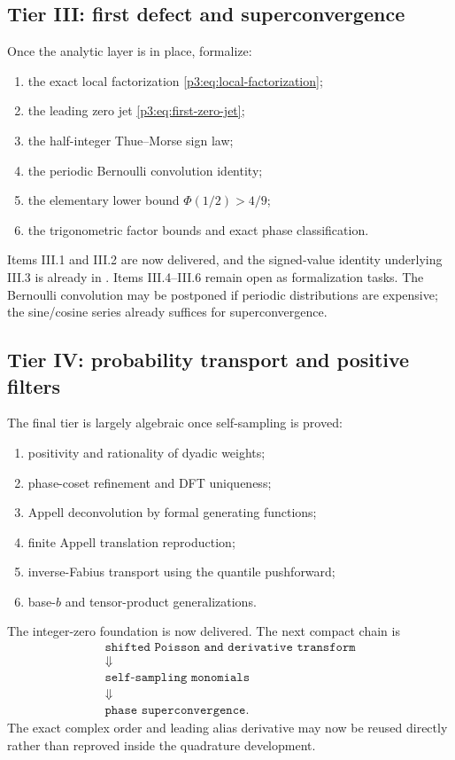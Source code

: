 \documentclass[11pt,oneside]{article}
\numberwithin{equation}{section}
\theoremstyle{definition}
\theoremstyle{remark}
\begin{document}
\subsection{Tier III: first defect and superconvergence}

Once the analytic layer is in place, formalize:
\begin{enumerate}[label=\textbf{III.\arabic*}]
\item the exact local factorization \eqref{p3:eq:local-factorization};
\item the leading zero jet \eqref{p3:eq:first-zero-jet};
\item the half-integer Thue--Morse sign law;
\item the periodic Bernoulli convolution identity;
\item the elementary lower bound $\Phi(1/2)>4/9$;
\item the trigonometric factor bounds and exact phase classification.
\end{enumerate}
Items III.1 and III.2 are now delivered, and the signed-value identity
underlying III.3 is already in .  Items
III.4--III.6 remain open as formalization tasks.
The Bernoulli convolution may be postponed if periodic distributions are expensive; the sine/cosine series already suffices for superconvergence.

\subsection{Tier IV: probability transport and positive filters}

The final tier is largely algebraic once self-sampling is proved:
\begin{enumerate}[label=\textbf{IV.\arabic*}]
\item positivity and rationality of dyadic weights;
\item phase-coset refinement and DFT uniqueness;
\item Appell deconvolution by formal generating functions;
\item finite Appell translation reproduction;
\item inverse-Fabius transport using the quantile pushforward;
\item base-$b$ and tensor-product generalizations.
\end{enumerate}

\begin{statusbox}
The integer-zero foundation is now delivered.  The next compact chain is
\[
 \begin{gathered}
 \texttt{shifted Poisson and derivative transform}\\
 \Downarrow\\
 \texttt{self-sampling monomials}\\
 \Downarrow\\
 \texttt{phase superconvergence}.
 \end{gathered}
\]
The exact complex order and leading alias derivative may now be reused
directly rather than reproved inside the quadrature development.
\end{statusbox}
\end{document}
